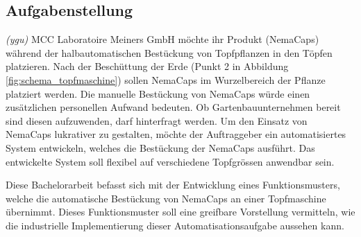 \subsection{Aufgabenstellung}
\textit{(ygu)} MCC Laboratoire Meiners GmbH möchte ihr Produkt (NemaCaps) während der halbautomatischen Bestückung von Topfpflanzen in den Töpfen platzieren. Nach der Beschüttung der Erde (Punkt 2 in Abbildung \ref{fig:schema_topfmaschine}) sollen NemaCaps im Wurzelbereich der Pflanze platziert werden. Die manuelle Bestückung von NemaCaps würde einen zusätzlichen personellen Aufwand bedeuten. Ob Gartenbauunternehmen bereit sind diesen aufzuwenden, darf hinterfragt werden. Um den Einsatz von NemaCaps lukrativer zu gestalten, möchte der Auftraggeber ein automatisiertes System entwickeln, welches die Bestückung der NemaCaps ausführt. Das entwickelte System soll flexibel auf verschiedene Topfgrössen anwendbar sein.
\newline

Diese Bachelorarbeit befasst sich mit der Entwicklung eines Funktionsmusters, welche die automatische Bestückung von NemaCaps an einer Topfmaschine übernimmt. Dieses Funktionsmuster soll eine greifbare Vorstellung vermitteln, wie die industrielle Implementierung dieser Automatisationsaufgabe aussehen kann. 
\newline 

